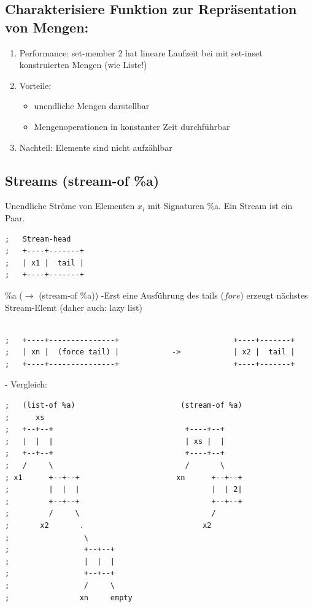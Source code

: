 \documentclass[a4paper, 20pt, openany]{book}
\begin{document}
\pagebreak

\subsection{Charakterisiere Funktion zur Repräsentation von Mengen:}
\begin{enumerate}
\item Performance: set-member 2
		hat lineare Laufzeit bei mit set-inset konstruierten Mengen (wie Liste!)
\item Vorteile:
\begin{itemize}
\item unendliche Mengen darstellbar
\item Mengenoperationen in konstanter Zeit durchführbar
\end{itemize}
\item Nachteil: Elemente sind nicht aufzählbar
\end{enumerate}


\subsection{Streams (stream-of \%a)}
Unendliche Ströme von Elementen $x_i$ mit Signaturen \%a. Ein Stream ist ein Paar.

\begin{lstlisting}
;   Stream-head
;   +----+-------+                             
;   | x1 |  tail |                             
;   +----+-------+   
\end{lstlisting}
\%a ($\rightarrow$ (stream-of \%a))
-Erst eine Ausführung des tails ($\underline{fore}$) erzeugt nächstes Stream-Elemt (daher auch: lazy list)

\begin{lstlisting}

;   +----+---------------+                          +----+-------+      
;   | xn |  (force tail) |            ->            | x2 |  tail |         
;   +----+---------------+                          +----+-------+ 
\end{lstlisting}

- Vergleich:
\begin{lstlisting}
;   (list-of %a)                        (stream-of %a)
;      xs
;   +--+--+                              +----+--+      
;   |  |  |                              | xs |  |   
;   +--+--+                              +----+--+  
;   /     \                              /       \
; x1      +--+--+                      xn      +--+--+      
;         |  |  |                              |  | 2|   
;         +--+--+                              +--+--+  
;         /     \                              /
;       x2       .                           x2
;                 \                             
;                 +--+--+                     
;                 |  |  |                         
;                 +--+--+                           
;                 /     \          
;                xn     empty  
\end{lstlisting}
\end{document}
